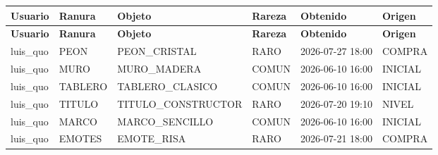 \begin{center}\footnotesize\setlength{\tabcolsep}{2pt}
\begin{longtable}{|L{46.6pt}|L{62.2pt}|L{147.0pt}|L{48.9pt}|L{83.3pt}|L{56.7pt}|}
\hline
\textbf{\hspace{0pt}Usuario} & \textbf{\hspace{0pt}Ranura} & \textbf{\hspace{0pt}Objeto} & \textbf{\hspace{0pt}Rareza} & \textbf{\hspace{0pt}Obtenido} & \textbf{\hspace{0pt}Origen} \\ \hline
\endfirsthead
\hline
\textbf{\hspace{0pt}Usuario} & \textbf{\hspace{0pt}Ranura} & \textbf{\hspace{0pt}Objeto} & \textbf{\hspace{0pt}Rareza} & \textbf{\hspace{0pt}Obtenido} & \textbf{\hspace{0pt}Origen} \\ \hline
\endhead
luis\_\allowbreak{}quo & PEON & PEON\_\allowbreak{}CRISTAL & RARO & 2026-07-27 18:00 & COMPRA \\ \hline
luis\_\allowbreak{}quo & MURO & MURO\_\allowbreak{}MADERA & COMUN & 2026-06-10 16:00 & INICIAL \\ \hline
luis\_\allowbreak{}quo & TABLERO & TABLERO\_\allowbreak{}CLASICO & COMUN & 2026-06-10 16:00 & INICIAL \\ \hline
luis\_\allowbreak{}quo & TITULO & TITULO\_\allowbreak{}CONSTRUCTOR & RARO & 2026-07-20 19:10 & NIVEL \\ \hline
luis\_\allowbreak{}quo & MARCO & MARCO\_\allowbreak{}SENCILLO & COMUN & 2026-06-10 16:00 & INICIAL \\ \hline
luis\_\allowbreak{}quo & EMOTES & EMOTE\_\allowbreak{}RISA & RARO & 2026-07-21 18:00 & COMPRA \\ \hline
\end{longtable}
\end{center}

